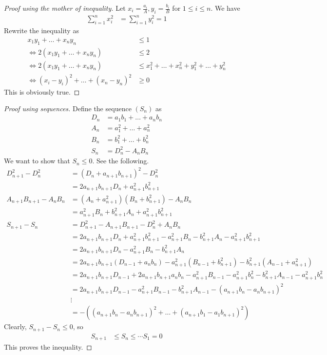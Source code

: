 \documentclass{subfile}
\begin{document}
		\begin{proof}[Proof using the mother of inequality]
			Let $x_i=\frac{a_i}{A},y_i=\frac{b_i}{B}$ for $1\leq i\leq n$. We have
				\begin{align*}
					\sum_{i=1}^nx_i^2
						& = \sum_{i=1}^ny_i^2=1
				\end{align*}
			Rewrite the inequality as
				\begin{align*}
					x_1y_1+\ldots+x_ny_n
						& \leq1\\
					\iff2(x_1y_1+\ldots+x_ny_n)
						& \leq2\\
					\iff2(x_1y_1+\ldots+x_ny_n)
						& \leq x_1^2+\ldots+x_n^2+y_1^2+\ldots+y_n^2\\
					\iff(x_i-y_i)^2+\ldots+(x_n-y_n)^2
						& \geq0
				\end{align*}
			This is obviously true.
		\end{proof}
	
		\begin{proof}[Proof using sequences]
			Define the sequence $(S_n)$ as
				\begin{align*}
					D_n
						& = a_1b_1+\ldots+a_nb_n\\
					A_n
						& = a_1^2+\ldots+a_n^2\\
					B_n
						& = b_1^2+\ldots+b_n^2\\
					S_n
						& = D_n^2-A_nB_n
				\end{align*}
			We want to show that $S_n\leq0$. See the following.
				\begin{align*}
					D_{n+1}^2-D_n^2
						& = (D_n+a_{n+1}b_{n+1})^2-D_n^2\\
						& = 2a_{n+1}b_{n+1}D_n+a_{n+1}^2b_{n+1}^2\\
					A_{n+1}B_{n+1}-A_nB_n
						& = (A_n+a_{n+1}^2)(B_n+b_{n+1}^2)-A_nB_n\\
						& = a_{n+1}^2B_n+b_{n+1}^2A_n+a_{n+1}^2b_{n+1}^2\\
					S_{n+1}-S_n
						& = D_{n+1}^2-A_{n+1}B_{n+1}-D_n^2+A_nB_n\\
						& = 2a_{n+1}b_{n+1}D_n+a_{n+1}^2b_{n+1}^2-a_{n+1}^2B_n-b_{n+1}^2A_n-a_{n+1}^2b_{n+1}^2\\
						& = 2a_{n+1}b_{n+1}D_n-a_{n+1}^2B_n-b_{n+1}^2A_n\\
						& = 2a_{n+1}b_{n+1}(D_{n-1}+a_nb_n)-a_{n+1}^2(B_{n-1}+b_{n+1}^2)-b_{n+1}^2(A_{n-1}+a_{n+1}^2)\\
						& = 2a_{n+1}b_{n+1}D_{n-1}+2a_{n+1}b_{n+1}a_nb_n-a_{n+1}^2B_{n-1}-a_{n+1}^2b_{n}^2-b_{n+1}^2A_{n-1}-a_{n+1}^2b_{n}^2\\
						& = 2a_{n+1}b_{n+1}D_{n-1}-a_{n+1}^2B_{n-1}-b_{n+1}^2A_{n-1}-(a_{n+1}b_n-a_{n}b_{n+1})^2\\
						& \vdots\\
						& = -\left((a_{n+1}b_n-a_nb_{n+1})^2+\ldots+(a_{n+1}b_1-a_1b_{n+1})^2\right)
				\end{align*}
			Clearly, $S_{n+1}-S_n\leq0$, so
				\begin{align*}
					S_{n+1}
						& \leq S_n\leq\cdots S_1=0
				\end{align*}
			This proves the inequality.
		\end{proof}
\end{document}
